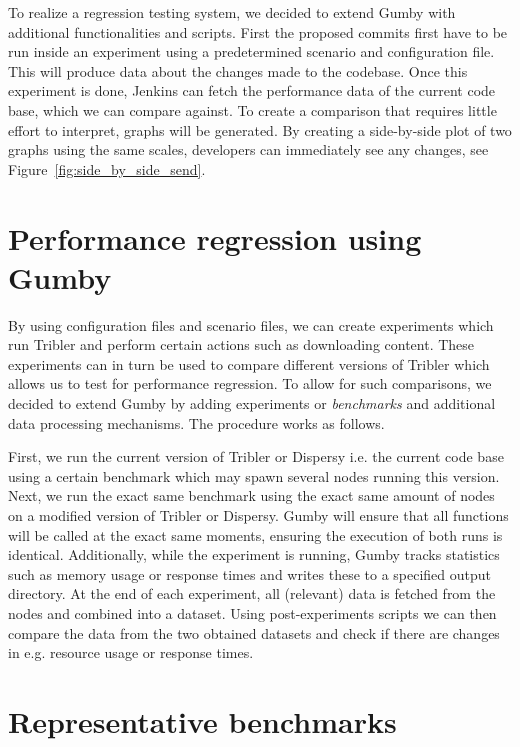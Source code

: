 To realize a regression testing system, we decided to extend Gumby with additional functionalities and scripts.
First the proposed commits first have to be run inside an experiment using a predetermined scenario and configuration file.
This will produce data about the changes made to the codebase.
Once this experiment is done, Jenkins can fetch the performance data of the current code base, which we can compare against.
To create a comparison that requires little effort to interpret, graphs  will be generated.
By creating a side-by-side plot of two graphs using the same scales, developers can immediately see any changes, see Figure~\ref{fig:side_by_side_send}.

\section{Performance regression using Gumby}

By using configuration files and scenario files, we can create experiments which run Tribler and perform certain actions such as downloading content.
These experiments can in turn be used to compare different versions of Tribler which allows us to test for performance regression. 
To allow for such comparisons, we decided to extend Gumby by adding experiments or \emph{benchmarks} and additional data processing mechanisms.
The procedure works as follows.

First, we run the current version of Tribler or Dispersy i.e. the current code base using a certain benchmark which may spawn several nodes running this version.
Next, we run the exact same benchmark using the exact same amount of nodes on a modified version of Tribler or Dispersy.
Gumby will ensure that all functions will be called at the exact same moments, ensuring the execution of both runs is identical.
Additionally, while the experiment is running, Gumby tracks statistics such as memory usage or response times and writes these to a specified output directory.
At the end of each experiment, all (relevant) data is fetched from the nodes and combined into a dataset.
Using post-experiments scripts we can then compare the data from the two obtained datasets and check if there are changes in e.g. resource usage or response times.

\section{Representative benchmarks}

